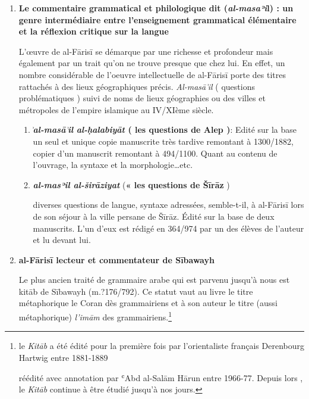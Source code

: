 \documentclass[a4paper,12pt]{report}
\begin{document}
\begin{itemize}
\begin{enumerate}
\begin{itemize}
\end{itemize}
    

    \item \textbf{Le commentaire grammatical et philologique dit  (\textit{al-masaʾi}l) : un genre intermédiaire entre l’enseignement grammatical élémentaire et la réflexion critique sur la langue }

     L’œuvre de al-Fārisī se démarque par une richesse et profondeur mais également par un trait  qu'on ne trouve presque que chez lui.
     En effet, un nombre considérable  de l'oeuvre intellectuelle de al-Fārisī porte  des titres rattachés à des lieux géographiques précis.  \textit{Al-masā ͗il} ( questions problématiques ) suivi de noms de lieux géographies ou des villes et métropoles de l’empire islamique au IV/XIème siècle.

     	\begin{enumerate}
     	    \item \textbf{\textit{͗al-masā ͗il al-ḥalabiyāt }  ( les questions de Alep )}: Edité sur  la base un seul et unique copie manuscrite très tardive remontant à 1300/1882, copier d’un manuscrit remontant à 494/1100. Quant au contenu de l’ouvrage, la syntaxe et la morphologie…etc.  

           \item	\textit{\textbf{al-masʾil al-širāziyat}}  (\textbf{« les questions de Šīrāz} )

            diverses questions de langue, syntaxe adressées, semble-t-il, à  al-Fārisī  lors de son séjour à la ville persane de Šīrāz. Édité sur la base de deux manuscrits. L'un d'eux est rédigé  en 364/974 par un des élèves de l'auteur et lu devant lui. 

          	\end{enumerate}
     
      

\item \textbf{	al-Fārisī lecteur et commentateur de S\=ibawayh}

Le  plus ancien traité  de  grammaire arabe qui est parvenu jusqu'à nous est kit\=ab de S\=ibawayh (m.?176/792). Ce statut vaut au livre le titre métaphorique le Coran dès grammairiens et à son auteur le titre (aussi métaphorique) \textit{l'im\=am} des grammairiens.\footnote{le \textit{Kit\=ab }a été édité pour la première fois par l'orientaliste français Derenbourg Hartwig entre 1881-1889

réédité avec  annotation par ʿAbd al-Salām Hārun entre 1966-77. Depuis lors , le \textit{Kit\=ab} continue à être étudié jusqu'à nos jours. 

}
\end{enumerate}
\end{itemize}
\end{document}
